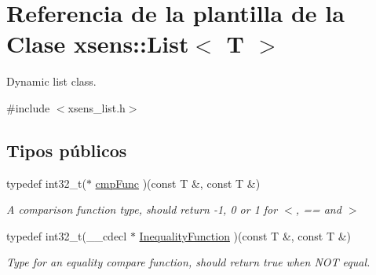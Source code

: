 \hypertarget{classxsens_1_1List}{\section{\-Referencia de la plantilla de la \-Clase xsens\-:\-:\-List$<$ \-T $>$}
\label{classxsens_1_1List}
}


\-Dynamic list class.  




{\ttfamily \#include $<$xsens\-\_\-list.\-h$>$}

\subsection*{\-Tipos públicos}
\begin{DoxyCompactItemize}
\item 
\hypertarget{classxsens_1_1List_a26e51481afc877f778345169693c4fea}{typedef int32\-\_\-t($\ast$ \hyperlink{classxsens_1_1List_a26e51481afc877f778345169693c4fea}{cmp\-Func} )(const \-T \&, const \-T \&)}\label{classxsens_1_1List_a26e51481afc877f778345169693c4fea}

\begin{DoxyCompactList}\small\item\em \-A comparison function type, should return -\/1, 0 or 1 for $<$, == and $>$ \end{DoxyCompactList}\item 
\hypertarget{classxsens_1_1List_a83d215d6221ce3aa3a0936d3bc7af86b}{typedef int32\-\_\-t(\-\_\-\-\_\-cdecl $\ast$ \hyperlink{classxsens_1_1List_a83d215d6221ce3aa3a0936d3bc7af86b}{\-Inequality\-Function} )(const \-T \&, const \-T \&)}\label{classxsens_1_1List_a83d215d6221ce3aa3a0936d3bc7af86b}

\begin{DoxyCompactList}\small\item\em \-Type for an equality compare function, should return true when \-N\-O\-T equal. \end{DoxyCompactList}\end{DoxyCompactItemize}

